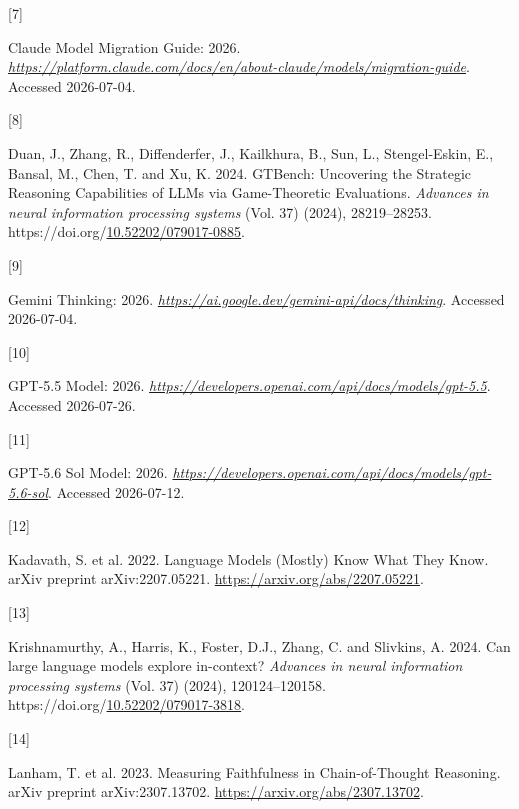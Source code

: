 \documentclass[
  10pt,
]{article}
\newlength{\cslhangindent}
\newlength{\csllabelwidth}
\newenvironment{CSLReferences}[2] %
 {\begin{list}{}{%
  \setlength{\itemindent}{0pt}
  \setlength{\leftmargin}{0pt}
  \setlength{\parsep}{0pt}
  \ifodd #1
   \setlength{\leftmargin}{\cslhangindent}
   \setlength{\itemindent}{-1\cslhangindent}
  \fi
  \setlength{\itemsep}{#2\baselineskip}}}
 {\end{list}}
\newcommand{\CSLLeftMargin}[1]{\parbox[t]{\csllabelwidth}{\strut#1\strut}}
\newcommand{\CSLRightInline}[1]{\parbox[t]{\linewidth - \csllabelwidth}{\strut#1\strut}}
\begin{document}
\begin{CSLReferences}{0}{0}
\CSLLeftMargin{{[}7{]} }%
\CSLRightInline{{Claude Model Migration Guide}: 2026. \href{https://platform.claude.com/docs/en/about-claude/models/migration-guide}{\emph{https://platform.claude.com/docs/en/about-claude/models/migration-guide}}. Accessed 2026-07-04.}

\CSLLeftMargin{{[}8{]} }%
\CSLRightInline{Duan, J., Zhang, R., Diffenderfer, J., Kailkhura, B., Sun, L., Stengel-Eskin, E., Bansal, M., Chen, T. and Xu, K. 2024. {GTBench: Uncovering the Strategic Reasoning Capabilities of LLMs via Game-Theoretic Evaluations}. \emph{Advances in neural information processing systems} (Vol. 37) (2024), 28219--28253. https://doi.org/\href{https://doi.org/10.52202/079017-0885}{10.52202/079017-0885}.}

\CSLLeftMargin{{[}9{]} }%
\CSLRightInline{{Gemini Thinking}: 2026. \href{https://ai.google.dev/gemini-api/docs/thinking}{\emph{https://ai.google.dev/gemini-api/docs/thinking}}. Accessed 2026-07-04.}

\CSLLeftMargin{{[}10{]} }%
\CSLRightInline{{GPT-5.5 Model}: 2026. \href{https://developers.openai.com/api/docs/models/gpt-5.5}{\emph{https://developers.openai.com/api/docs/models/gpt-5.5}}. Accessed 2026-07-26.}

\CSLLeftMargin{{[}11{]} }%
\CSLRightInline{{GPT-5.6 Sol Model}: 2026. \href{https://developers.openai.com/api/docs/models/gpt-5.6-sol}{\emph{https://developers.openai.com/api/docs/models/gpt-5.6-sol}}. Accessed 2026-07-12.}

\CSLLeftMargin{{[}12{]} }%
\CSLRightInline{Kadavath, S. et al. 2022. {Language Models (Mostly) Know What They Know}. arXiv preprint arXiv:2207.05221. \url{https://arxiv.org/abs/2207.05221}.}

\CSLLeftMargin{{[}13{]} }%
\CSLRightInline{Krishnamurthy, A., Harris, K., Foster, D.J., Zhang, C. and Slivkins, A. 2024. {Can large language models explore in-context?} \emph{Advances in neural information processing systems} (Vol. 37) (2024), 120124--120158. https://doi.org/\href{https://doi.org/10.52202/079017-3818}{10.52202/079017-3818}.}

\CSLLeftMargin{{[}14{]} }%
\CSLRightInline{Lanham, T. et al. 2023. {Measuring Faithfulness in Chain-of-Thought Reasoning}. arXiv preprint arXiv:2307.13702. \url{https://arxiv.org/abs/2307.13702}.}


\end{CSLReferences}
\end{document}
